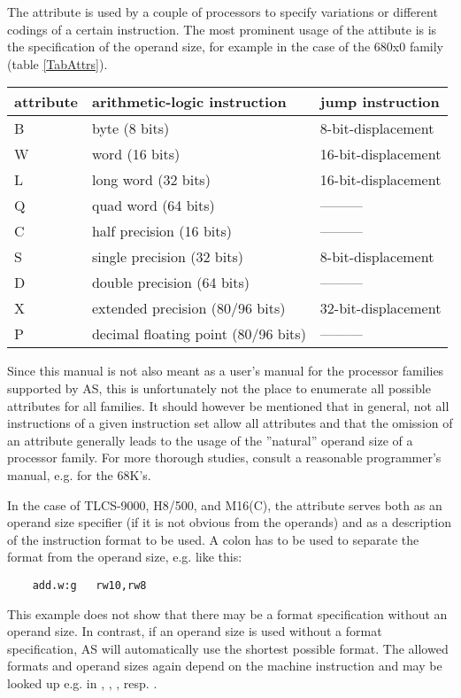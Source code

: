 \documentclass[12pt,twoside]{report}
\begin{document}
The attribute is used by a couple of processors to specify variations or
different codings of a certain instruction.  The most prominent usage of
the attibute is is the specification of the operand size, for example in
the case of the 680x0 family (table \ref{TabAttrs}).
\begin{table*}[htb]
\begin{center}\begin{tabular}{|l|l|l|}
\hline
attribute & arithmetic-logic instruction & jump instruction\\
\hline
\hline
B     & byte (8 bits)                       &  8-bit-displacement \\
W     & word (16 bits)                      &  16-bit-displacement \\
L     & long word (32 bits)                 &  16-bit-displacement \\
Q     & quad word (64 bits)                 &  --------- \\
C     & half precision (16 bits)            &  --------- \\
S     & single precision (32 bits)          &  8-bit-displacement \\
D     & double precision (64 bits)          &  --------- \\
X     & extended precision (80/96 bits)     &  32-bit-displacement \\
P     & decimal floating point (80/96 bits) &  --------- \\
\hline
\end{tabular}\end{center}
\caption{Allowed Attributes (Example 680x0) \label{TabAttrs}}
\end{table*}
\par
Since this manual is not also meant as a user's manual for the processor
families supported by AS, this is unfortunately not the place to enumerate
all possible attributes for all families.  It should however be mentioned
that in general, not all instructions of a given instruction set allow all
attributes and that the omission of an attribute generally leads to the
usage of the ''natural'' operand size of a processor family. For more
thorough studies, consult a reasonable programmer's manual, e.g.
\cite{Williams} for the 68K's.

In the case of TLCS-9000, H8/500, and M16(C), the attribute serves
both as an operand size specifier (if it is not obvious from the
operands) and as a description of the instruction format to be used.
A colon has to be used to separate the format from the operand size,
e.g. like this:
\begin{verbatim}
    add.w:g   rw10,rw8
\end{verbatim}
This example does not show that there may be a format specification
without an operand size.  In contrast, if an operand size is used
without a format specification, AS will automatically use the
shortest possible format.  The allowed formats and operand sizes
again depend on the machine instruction and may be looked up e.g. in
\cite{Tosh900}, \cite{HitH8_5}, \cite{MitM16}, resp. \cite{MitM16C}.
\end{document}
